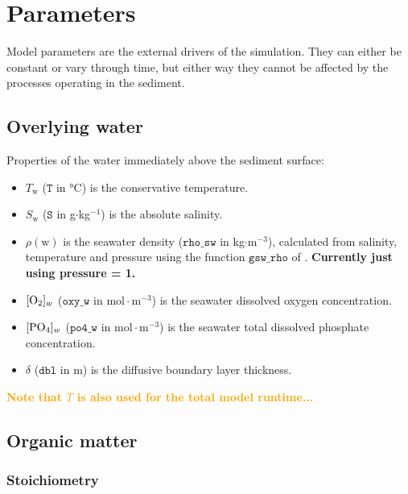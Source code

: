 \documentclass[a4paper]{article}
\newcommand{\code}[1]{\texttt{#1}}
\newcommand{\molmmm}{\mathrm{mol}\cdot\mathrm{m}^{-3}}
\newcommand{\degC}{\si{\degree}\mathrm{C}}
\newcommand{\wtf}[1]{\textcolor{Cerulean}{\textbf{#1}}}
\newcommand{\codenote}[1]{\textcolor{Orange}{\textbf{#1}}}
\begin{document}

\section{Parameters}

Model parameters are the external drivers of the simulation.  They can either be constant or vary through time, but either way they cannot be affected by the processes operating in the sediment.


\subsection{Overlying water}

Properties of the water immediately above the sediment surface:

\begin{itemize}
  \item $T_\mathrm{w}$ ($\code{T}$ in $\degC$) is the conservative temperature.
  \item $S_\mathrm{w}$ ($\code{S}$ in g$\cdot$kg$^{-1}$) is the absolute salinity.
  \item $\rho(\mathrm{w})$ is the seawater density ($\code{rho\_sw}$ in kg$\cdot$m$^{-3}$), calculated from salinity, temperature and pressure using the function $\code{gsw\_rho}$ of \citet{mcdougall_getting_2011}.  \wtf{Currently just using pressure = 1.}
  \item $[\ce{O2}]_w$ ($\code{oxy\_w}$ in $\molmmm$) is the seawater dissolved oxygen concentration.
  \item $[\ce{PO4}]_w$ ($\code{po4\_w}$ in $\molmmm$) is the seawater total dissolved phosphate concentration.
  \item $\delta$ ($\code{dbl}$ in m) is the diffusive boundary layer thickness.
\end{itemize}
\codenote{Note that $T$ is also used for the total model runtime...}


\subsection{Organic matter}

\subsubsection{Stoichiometry}
\end{document}

